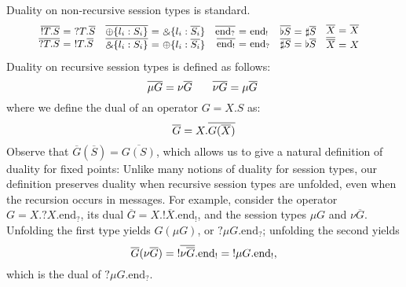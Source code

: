 \documentclass[orivec,envcountsame]{llncs}
\makeatletter
\newcommand{\with}{\mathbin\binampersand}
\newcommand{\gvdual}[1]{\overline{#1}}
\newcommand{\gvout}[2]{{!#1.#2}}
\newcommand{\gvin}[2]{{?#1.#2}}
\newcommand{\outterm}{\mathrm{end}_!}
\newcommand{\interm}{\mathrm{end}_?}
\newcommand{\gvserver}[1]{\flat #1}
\newcommand{\gvservice}[1]{\sharp #1}
\newcommand{\ba}{\begin{array}}
\newcommand{\ea}{\end{array}}
\newenvironment{eqs}{\ba{@{}r@{~}c@{~}l@{}}}{\ea}
\makeatother
\begin{document}
Duality on non-recursive session types is standard.
\[
\small
\ba{@{}c@{\quad}c@{\quad}c@{\quad}c@{\quad}c@{\quad}@{}}
\begin{eqs}
\gvdual{\gvout{T}{S}} &=& \gvin{T}{\gvdual{S}} \\
\gvdual{\gvin{T}{S}} &=& \gvout{T}{\gvdual{S}} \\
\end{eqs}
&
\begin{eqs}
  \gvdual{\oplus \{ l_i: S_i \}} &=& \with \{ l_i : \gvdual{S_i} \} \\
  \gvdual{\with \{ l_i: S_i \}} &=& \oplus \{ l_i : \gvdual{S_i} \} \\
\end{eqs}
&
\begin{eqs}
  \gvdual{\interm} &=& \outterm \\
  \gvdual{\outterm} &=& \interm \\
\end{eqs}
&
\begin{eqs}
  \gvdual{\gvserver{S}} &=& \gvservice{\gvdual{S}} \\
  \gvdual{\gvservice{S}} &=& \gvserver{\gvdual{S}} \\
\end{eqs}
&
\begin{eqs}
  \gvdual{X} &=& \gvdual{X} \\
  \gvdual{\gvdual{X}} &=& X
\end{eqs} \\
\ea
\]
Duality on recursive session types is defined as follows:
\[
\small
\gvdual{\mu G} = \nu \gvdual{G} \qquad \gvdual{\nu G} = \mu \gvdual{G} \
\]%
where we define the dual of an operator $G = X.S$ as:
\[
\small
\gvdual{G} = X.\gvdual{G(\gvdual{X})}
\]%
%
Observe that $\gvdual{G}(\gvdual{S}) = \gvdual{G(S)}$, which allows us to
give a natural definition of duality for fixed points:
%
Unlike many notions of duality for session types, our definition preserves duality when recursive
session types are unfolded, even when the recursion occurs in messages.  For example, consider the
operator $G = X.\gvin{X}{\interm}$, its dual $\gvdual{G} = X.\gvout{\gvdual{X}}{\outterm}$, and the
session types $\mu G$ and $\nu \gvdual{G}$.  Unfolding the first type yields $G(\mu G)$, or
$\gvin{\mu G}{\interm}$; unfolding the second yields
\[
\small
  \gvdual{G}(\nu \gvdual{G}) = \gvout{\gvdual{\nu \gvdual{G}}}{\outterm} = \gvout{\mu G}{\outterm},
\]
which is the dual of $\gvin{\mu G}{\interm}$.
\end{document}
